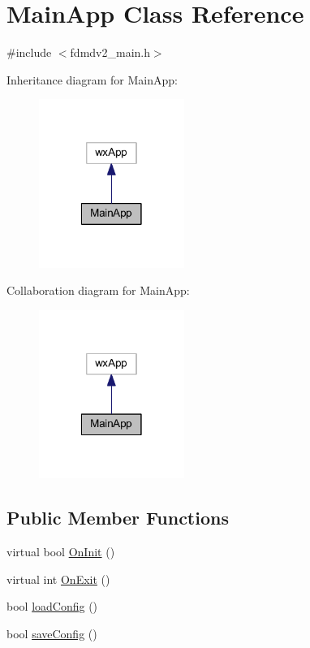 \hypertarget{class_main_app}{\section{Main\-App Class Reference}
\label{class_main_app}
}


{\ttfamily \#include $<$fdmdv2\-\_\-main.\-h$>$}



Inheritance diagram for Main\-App\-:\nopagebreak
\begin{figure}[H]
\begin{center}
\leavevmode
\includegraphics[width=134pt]{class_main_app__inherit__graph}
\end{center}
\end{figure}


Collaboration diagram for Main\-App\-:\nopagebreak
\begin{figure}[H]
\begin{center}
\leavevmode
\includegraphics[width=134pt]{class_main_app__coll__graph}
\end{center}
\end{figure}
\subsection*{Public Member Functions}
\begin{DoxyCompactItemize}
\item 
virtual bool \hyperlink{class_main_app_aff3d398e1b61f1016c37d57798f86731}{On\-Init} ()
\item 
virtual int \hyperlink{class_main_app_a7fcdb66d2268e47420a4a234808cf321}{On\-Exit} ()
\item 
bool \hyperlink{class_main_app_af06cc098b89d1c606aa94ad87d6b0105}{load\-Config} ()
\item 
bool \hyperlink{class_main_app_a620a6b1b271571cc10b8f36e45bfcd7e}{save\-Config} ()
\end{DoxyCompactItemize}
